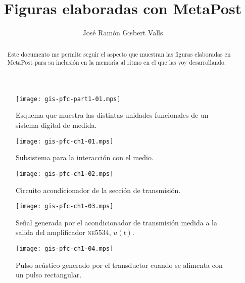 \documentclass[a4paper,12pt]{article}
\title{Figuras elaboradas con MetaPost}
\author{José Ramón Gisbert Valls}
\begin{document}
\maketitle{}

\begin{abstract}
	Este documento me permite seguir el aspecto que muestran las figuras elaboradas en MetaPost para su inclusión en la memoria al ritmo en el que las voy desarrollando.
\end{abstract}

\listoffigures

\begin{figure}
	\begin{center}
		\texttt{[image: gis-pfc-part1-01.mps]}
	\end{center}
	\caption[Sistema digital de medida]{Esquema que muestra las distintas unidades funcionales de un sistema digital de medida.}
	\label{fig:digmeasstm}
\end{figure}

\begin{figure}
	\begin{center}
		\texttt{[image: gis-pfc-ch1-01.mps]}
	\end{center}
	\caption[Subsistema para la interacción con el medio]{Subsistema para la interacción con el medio.}
	\label{fig:submedium}
\end{figure}

\begin{figure}
	\begin{center}
		\texttt{[image: gis-pfc-ch1-02.mps]}
	\end{center}
	\caption[Circuito acondicionador de la sección de transmisión]{Circuito acondicionador de la sección de transmisión.}
	\label{fig:txconditioner}
\end{figure}

\begin{figure}
	\begin{center}
		\texttt{[image: gis-pfc-ch1-03.mps]}
	\end{center}
	\caption[Señal a la salida del amplificador \textsc{ne5534}, $u(t)$]{Señal generada por el acondicionador de transmisión medida a la salida del amplificador \textsc{ne5534}, $u(t)$.}
	\label{fig:txacvo}
\end{figure}

\clearpage

\begin{figure}
	\begin{center}
		\texttt{[image: gis-pfc-ch1-04.mps]}
	\end{center}
	\caption[Pulso acústico generado por el transductor]{Pulso acústico generado por el transductor cuando se alimenta con un pulso rectangular.}
	\label{fig:pulse}
\end{figure}
\end{document}
